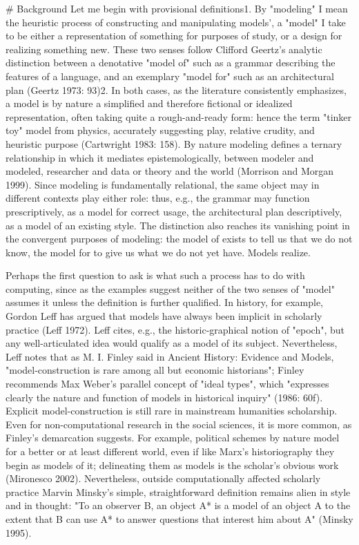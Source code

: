 # Background
Let me begin with provisional definitions1. By "modeling" I mean the heuristic process of constructing and manipulating models', a "model" I take to be either a representation of something for purposes of study, or a design for realizing something new. These two senses follow Clifford Geertz's analytic distinction between a denotative "model of" such as a grammar describing the features of a language, and an exemplary "model for" such as an architectural plan (Geertz 1973: 93)2. In both cases, as the literature consistently emphasizes, a model is by nature a simplified and therefore fictional or idealized representation, often taking quite a rough-and-ready form: hence the term "tinker toy" model from physics, accurately suggesting play, relative crudity, and heuristic purpose (Cartwright 1983: 158). By nature modeling defines a ternary relationship in which it mediates epistemologically, between modeler and modeled, researcher and data or theory and the world (Morrison and Morgan 1999). Since modeling is fundamentally relational, the same object may in different contexts play either role: thus, e.g., the grammar may function prescriptively, as a model for correct usage, the architectural plan descriptively, as a model of an existing style. The distinction also reaches its vanishing point in the convergent purposes of modeling: the model of exists to tell us that we do not know, the model for to give us what we do not yet have. Models realize.

Perhaps the first question to ask is what such a process has to do with computing, since as the examples suggest neither of the two senses of "model" assumes it unless the definition is further qualified. In history, for example, Gordon Leff has argued that models have always been implicit in scholarly practice (Leff 1972). Leff cites, e.g., the historic-graphical notion of "epoch", but any well-articulated idea would qualify as a model of its subject. Nevertheless, Leff notes that as M. I. Finley said in Ancient History: Evidence and Models, "model-construction is rare among all but economic historians"; Finley recommends Max Weber's parallel concept of "ideal types", which "expresses clearly the nature and function of models in historical inquiry" (1986: 60f). Explicit model-construction is still rare in mainstream humanities scholarship. Even for non-computational research in the social sciences, it is more common, as Finley's demarcation suggests. For example, political schemes by nature model for a better or at least different world, even if like Marx's historiography they begin as models of it; delineating them as models is the scholar's obvious work (Mironesco 2002). Nevertheless, outside computationally affected scholarly practice Marvin Minsky's simple, straightforward definition remains alien in style and in thought: "To an observer B, an object A* is a model of an object A to the extent that B can use A* to answer questions that interest him about A" (Minsky 1995).

